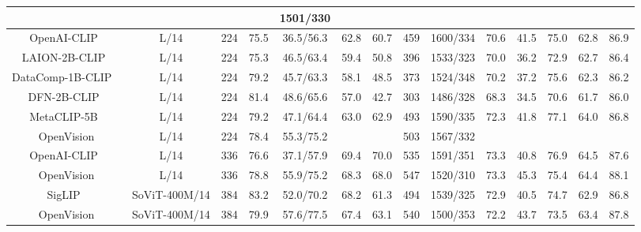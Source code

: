 \begin{table}[t!]
{\begin{tabular}{c|c|c|c|c|c|c|c|c|c|c|c|c|c}
    &\cellcolor{cyan!10}{66.3}
    &\cellcolor{cyan!10}{67.4}
    &\cellcolor{cyan!10}{499}
    &\cellcolor{cyan!10}1501/330
    &\cellcolor{cyan!10}{72.9}
    &\cellcolor{cyan!10}{40.6}
    &\cellcolor{cyan!10}{69.8}
    &\cellcolor{cyan!10}{64.0}
    &\cellcolor{cyan!10}{87.7}\\
    \midrule
    OpenAI-CLIP~\citep{radford2021clip} & L/14 & 224  &75.5  &36.5/56.3  & 62.8 & 60.7 & 459 & 1600/334 & 70.6 & 41.5 & 75.0 & 62.8  & 86.9 \\
    LAION-2B-CLIP~\citep{openclip} & L/14 & 224  &75.3 &46.5/63.4  &59.4 &50.8 &396 &1533/323 &70.0 &36.2 &72.9 &62.7  &86.4 \\
    DataComp-1B-CLIP ~\citep{gadre2023datacomp} & L/14 & 224  &79.2&45.7/63.3  &58.1 &48.5 &373 &1524/348 &70.2 &37.2 &75.6 &62.3  &86.2\\
    DFN-2B-CLIP~\citep{dfn} & L/14 & 224&81.4 &48.6/65.6 &57.0 &42.7 &303 &1486/328 &68.3 &34.5 &70.6 &61.7 &86.0 \\
    MetaCLIP-5B~\citep{metaclip} & L/14 & 224& 79.2&47.1/64.4 & 63.0 & 62.9 & 493& 1590/335& 72.3& 41.8& 77.1& 64.0& 86.8\\
    \rowcolor{cyan!10} \textsf{OpenVision} & \cellcolor{cyan!10}L/14 & \cellcolor{cyan!10}224
    &\cellcolor{cyan!10}78.4  & \cellcolor{cyan!10}55.3/75.2  &\cellcolor{cyan!10}{65.7} & \cellcolor{cyan!10}{61.5}  & \cellcolor{cyan!10} {503}  & \cellcolor{cyan!10}1567/332  &\cellcolor{cyan!10}{73.1} &\cellcolor{cyan!10}{41.4}
    &\cellcolor{cyan!10}{73.1}
    &\cellcolor{cyan!10}{64.7}
    &\cellcolor{cyan!10}{87.8}  \\
    \midrule
     OpenAI-CLIP~\citep{radford2021clip} & L/14 &336
    &76.6 &37.1/57.9
     &69.4
    &70.0
    &535
    &1591/351
    &73.3
    &40.8
    &76.9
    &64.5
    &87.6\\
    \rowcolor{cyan!10} \textsf{OpenVision} & \cellcolor{cyan!10}L/14 & \cellcolor{cyan!10}336
   &\cellcolor{cyan!10}78.8 &\cellcolor{cyan!10}55.9/75.2
    &68.3
    &68.0
    &547
    &1520/310
    &73.3
    &45.3
    &75.4
    &64.4
    &88.1
\\
SigLIP~\citep{zhai2023sigmoid} &SoViT-400M/14 &384 &83.2 &52.0/70.2 &68.2
&61.3
&494
&1539/325
&72.9
&40.5
&74.7
&62.9
&86.8
 \\
  \rowcolor{cyan!10}\textsf{OpenVision} & SoViT-400M/14 & 384 & 79.9  & 57.6/77.5
&67.4
&63.1
&540
&1500/353
&72.2
&43.7
&73.5
&63.4
&87.8
\\
    \bottomrule
    \end{tabular}}
    \vspace{-.7em}
\end{table}

